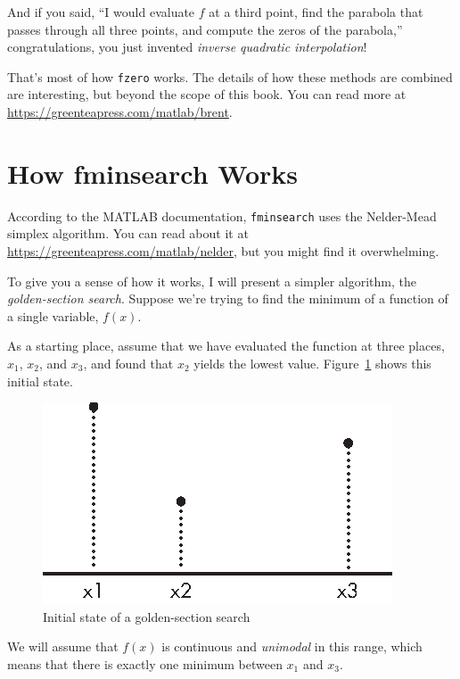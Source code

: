 And if you said, ``I would evaluate $f$ at a third point, find the
parabola that passes through all three points, and compute the zeros
of the parabola,'' congratulations, you just invented
\emph{inverse quadratic interpolation}!

That's most of how \lstinline{fzero} works.  The details of how these methods are combined are interesting, but beyond the scope of this book.  You can read more at \url{https://greenteapress.com/matlab/brent}.


\section{How fminsearch Works}
\label{howfminsearch}

According to the MATLAB documentation, \lstinline{fminsearch} uses the Nelder-Mead simplex algorithm.  You can read about it at \url{https://greenteapress.com/matlab/nelder}, but you might find it overwhelming.


To give you a sense of how it works, I will present a simpler algorithm, the \emph{golden-section search}.  Suppose we're trying to find the minimum of a function of a single variable, $f(x)$.

As a starting place, assume that we have evaluated the function at three places,
$x_1$, $x_2$, and $x_3$, and found that $x_2$ yields the lowest
value. Figure~\ref{fig:golden1} shows this initial state.

\begin{figure}[h]
\includegraphics{images/figure15_04_new.eps}
\caption{Initial state of a golden-section search}
\label{fig:golden1}
\end{figure}

We will assume that $f(x)$ is continuous and \emph{unimodal} in this range, which means that there is exactly one minimum between $x_1$ and $x_3$.

